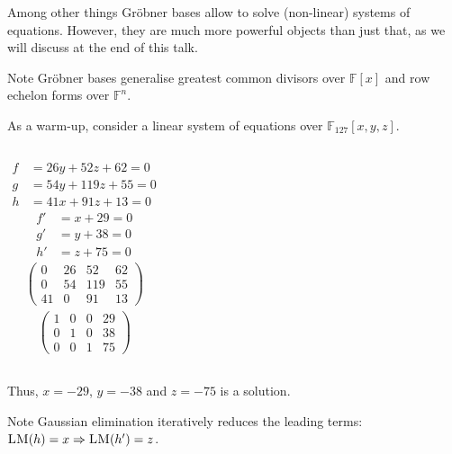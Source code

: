 \documentclass[9pt]{beamer}
\newcommand{\field}[1]{\mathbb{#1}}
\newcommand{\LM}[1]{\ensuremath{\textsc{LM}(#1)\xspace}}
\begin{document}
\begin{frame}
\vspace{1em}

Among other things Gröbner bases allow to solve (non-linear) systems of equations. However, they are much more powerful objects than just that, as we will discuss at the end of this talk.

\vspace{1em}

\begin{block}{Note}
Gröbner bases generalise greatest common divisors over $\field{F}[x]$ and row echelon forms over $\field{F}^n$.
\end{block}

\framebreak

As a warm-up, consider a linear system of equations over $\field{F}_{127}[x,y,z]$.

\begin{columns}
\begin{align*}
f &= 26y + 52z + 62 = 0\\
g &= 54y + 119z + 55 = 0\\
h &= 41x + 91z + 13 = 0
\end{align*}
\begin{align*}
f' &= x + 29 = 0\\
g' &= y + 38 = 0\\
h' &= z + 75 = 0
\end{align*}
\begin{align*}
\left(\begin{array}{rrrr}
0 & 26 & 52 & 62 \\
0 & 54 & 119 & 55 \\
41 & 0 & 91 & 13
\end{array}\right)
\end{align*}
\begin{align*}
\left(\begin{array}{rrrr}
1 & 0 & 0 & 29 \\
0 & 1 & 0 & 38 \\
0 & 0 & 1 & 75
\end{array}\right)
\end{align*}
\end{columns}

\vspace{1em}

Thus, $x = -29$, $y = - 38$ and $z = - 75$ is a solution.

\vspace{1em}

\begin{block}{Note}
Gaussian elimination iteratively reduces the leading terms: $\LM{h} = x \Rightarrow \LM{h'} = z$.
\end{block}


\end{frame}
\end{document}
